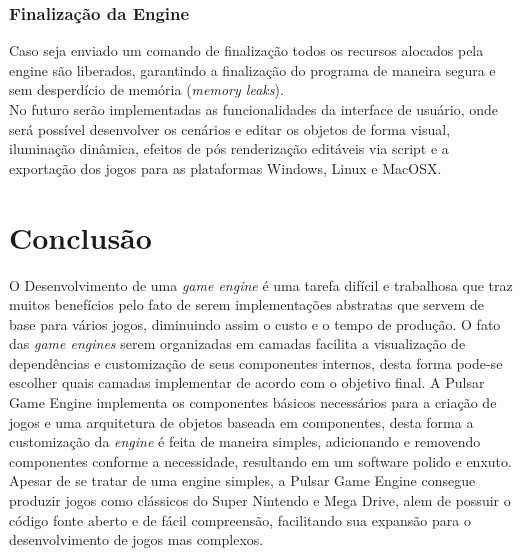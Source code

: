 \documentclass[12pt,	openright, twoside,	a4paper, english, french, spanish, brazil]{abntex2}
\begin{document}
\subsection{Finalização da Engine}
Caso seja enviado um comando de finalização todos os recursos alocados pela engine são liberados, garantindo a finalização do programa de maneira segura e sem desperdício de memória (\textit{memory leaks}). \\


No futuro serão implementadas as funcionalidades da interface de usuário, onde será possível desenvolver os cenários e editar os objetos de forma visual, iluminação dinâmica, efeitos de pós renderização editáveis via script e a exportação dos jogos para as plataformas Windows, Linux e MacOSX.

%
%

\chapter{Conclusão} \label{cap: conclusao}
O Desenvolvimento de uma \textit{game engine} é uma tarefa difícil e trabalhosa que traz muitos benefícios pelo fato de serem implementações abstratas que servem de base para vários jogos, diminuindo assim o custo e o tempo de produção. O fato das \textit{game engines} serem organizadas em camadas facilita a visualização de dependências e customização de seus componentes internos, desta forma pode-se escolher quais camadas implementar de acordo com o objetivo final. A Pulsar Game Engine implementa os componentes básicos necessários para a criação de jogos e uma arquitetura de objetos baseada em componentes, desta forma a customização da \textit{engine} é feita de maneira simples, adicionando e removendo componentes conforme a necessidade, resultando em um software polido e enxuto. \\
Apesar de se tratar de uma engine simples, a Pulsar Game Engine consegue produzir jogos como clássicos do Super Nintendo e Mega Drive, alem de possuir o código fonte aberto e de fácil compreensão, facilitando sua expansão para o desenvolvimento de jogos mas complexos.


\end{document}

